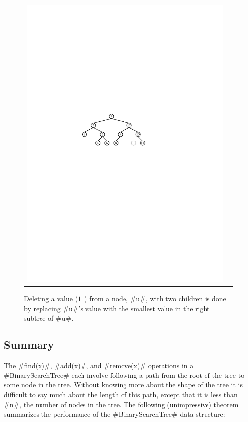 \begin{figure}
\begin{center}
\begin{tabular}{cc}
    \includegraphics[width=\HalfScaleIfNeeded]{figs/bst-delete-2}
    \end{tabular}
  \end{center}
  \caption[Deleting from a BinarySearchTree]{Deleting a value ($11$) from a node, #u#, with two children is done by replacing #u#'s value with the smallest value in the right subtree of #u#.}
\end{figure}

\subsection{Summary}

The #find(x)#, #add(x)#, and #remove(x)# operations in a
#BinarySearchTree# each involve following a path from the root of the
tree to some node in the tree. Without knowing more about the shape of
the tree it is difficult to say much about the length of this path,
except that it is less than #n#, the number of nodes in the tree.
The following (unimpressive) theorem summarizes the performance of the
#BinarySearchTree# data structure:

